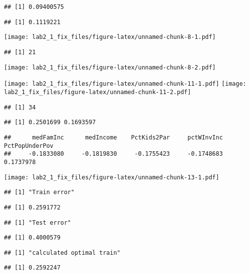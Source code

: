 \documentclass[
]{article}
\begin{document}
\begin{verbatim}
## [1] 0.09400575
\end{verbatim}

\begin{verbatim}
## [1] 0.1119221
\end{verbatim}

\texttt{[image: lab2\_1\_fix\_files/figure-latex/unnamed-chunk-8-1.pdf]}

\begin{verbatim}
## [1] 21
\end{verbatim}

\texttt{[image: lab2\_1\_fix\_files/figure-latex/unnamed-chunk-8-2.pdf]}

\texttt{[image: lab2\_1\_fix\_files/figure-latex/unnamed-chunk-11-1.pdf]}
\texttt{[image: lab2\_1\_fix\_files/figure-latex/unnamed-chunk-11-2.pdf]}

\begin{verbatim}
## [1] 34
\end{verbatim}

\begin{verbatim}
## [1] 0.2501699 0.1693597
\end{verbatim}

\begin{verbatim}
##      medFamInc      medIncome    PctKids2Par     pctWInvInc PctPopUnderPov 
##     -0.1833080     -0.1819830     -0.1755423     -0.1748683      0.1737978
\end{verbatim}

\texttt{[image: lab2\_1\_fix\_files/figure-latex/unnamed-chunk-13-1.pdf]}

\begin{verbatim}
## [1] "Train error"
\end{verbatim}

\begin{verbatim}
## [1] 0.2591772
\end{verbatim}

\begin{verbatim}
## [1] "Test error"
\end{verbatim}

\begin{verbatim}
## [1] 0.4000579
\end{verbatim}

\begin{verbatim}
## [1] "calculated optimal train"
\end{verbatim}

\begin{verbatim}
## [1] 0.2592247
\end{verbatim}
\end{document}
